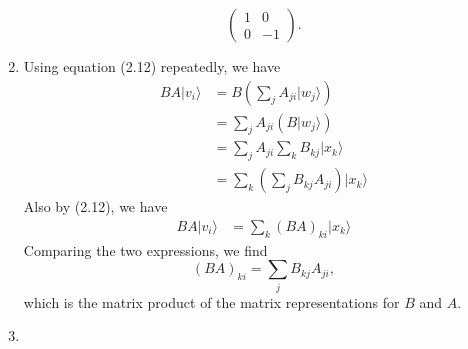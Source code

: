 \documentclass[12 pt]{article}
\begin{document}
\begin{enumerate}
$$\begin{pmatrix}
	1&0\\0&-1
\end{pmatrix}.$$
\item Using equation (2.12) repeatedly, we have 
	\begin{align*}
	BA|v_i\rangle &= B(\sum_j A_{ji}|w_j\rangle) \\
	&=\sum_j A_{ji}(B|w_j\rangle) \\
	&=\sum_j A_{ji} \sum_k B_{kj}|x_k\rangle \\
	&=\sum_k (\sum_j B_{kj}A_{ji})|x_k\rangle 
	\end{align*}
Also by (2.12), we have 
	\begin{align*}
	BA|v_i\rangle &=\sum_k (BA)_{ki}|x_k\rangle\end{align*}
Comparing the two expressions, we find
$$(BA)_{ki}=\sum_j B_{kj}A_{ji},$$
which is the matrix product of the matrix representations for $B$ and $A$.
\item 
\end{enumerate}
\end{document}
